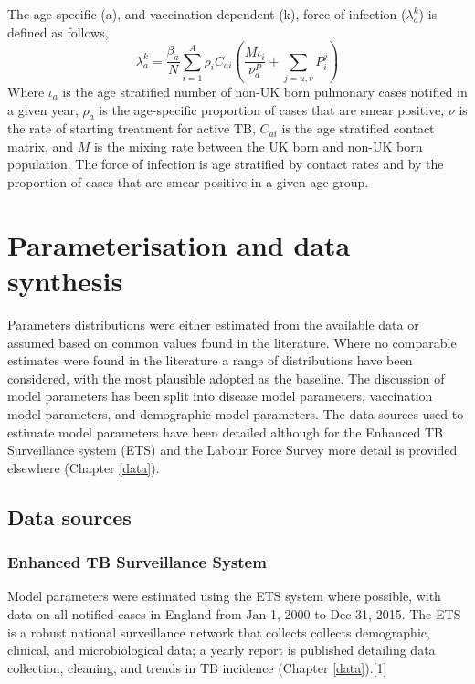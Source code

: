\documentclass[11pt,twoside]{bristolthesis}
\begin{document}
  The age-specific (a), and vaccination dependent (k), force of infection (\(\lambda^k_a\)) is defined as follows,
  \begin{equation}
  \lambda^k_a = \frac{\beta_a}{N} \sum\limits_{i=1}^{A} \rho_i C_{ai}(\frac{M\iota_i}{\nu_a^P} + \sum\limits_{j = u,v}P^j_i)
    \label{eq:force-of-infection}
  \end{equation}
  Where \(\iota_a\) is the age stratified number of non-UK born pulmonary cases notified in a given year, \(\rho_a\) is the age-specific proportion of cases that are smear positive, \(\nu\) is the rate of starting treatment for active TB, \(C_{ai}\) is the age stratified contact matrix, and \(M\) is the mixing rate between the UK born and non-UK born population. The force of infection is age stratified by contact rates and by the proportion of cases that are smear positive in a given age group.
  
  \hypertarget{parameterisation-and-data-synthesis}{%
  \section{Parameterisation and data synthesis}\label{parameterisation-and-data-synthesis}}
  
  Parameters distributions were either estimated from the available data or assumed based on common values found in the literature. Where no comparable estimates were found in the literature a range of distributions have been considered, with the most plausible adopted as the baseline. The discussion of model parameters has been split into disease model parameters, vaccination model parameters, and demographic model parameters. The data sources used to estimate model parameters have been detailed although for the Enhanced TB Surveillance system (ETS) and the Labour Force Survey more detail is provided elsewhere (Chapter \ref{data}).
  
  \hypertarget{data-sources-1}{%
  \subsection{Data sources}\label{data-sources-1}}
  
  \hypertarget{enhanced-tb-surveillance-system}{%
  \subsubsection{Enhanced TB Surveillance System}\label{enhanced-tb-surveillance-system}}
  
  Model parameters were estimated using the ETS system where possible, with data on all notified cases in England from Jan 1, 2000 to Dec 31, 2015. The ETS is a robust national surveillance network that collects collects demographic, clinical, and microbiological data; a yearly report is published detailing data collection, cleaning, and trends in TB incidence (Chapter \ref{data}).{[}1{]}
  
\end{document}
